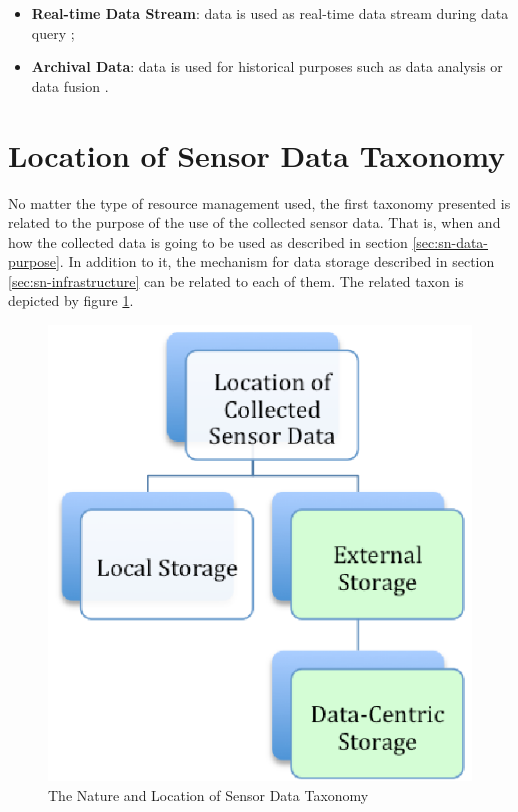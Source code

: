 \begin{itemize}
  \item \textbf{Real-time Data Stream}: data is used as real-time data stream
  during data query \cite{sn-intro01};
  \item \textbf{Archival Data}: data is used for historical purposes such as
  data analysis or data fusion \cite{sn-intro01, sn-intro02}.
\end{itemize}

\section{Location of Sensor Data Taxonomy}

No matter the type of resource management used, the first taxonomy presented is
related to the purpose of the use of the collected sensor data. That is, when
and how the collected data is going to be used as described in section
\ref{sec:sn-data-purpose}. In addition to it, the mechanism for data storage
described in section \ref{sec:sn-infrastructure} can be related to each of
them. The related taxon is depicted by figure \ref{fig:taxonomy-data-location}.

\begin{figure}[h]
  \centering
  \includegraphics{../diagrams/taxonomy-data-location}
  \caption{The Nature and Location of Sensor Data Taxonomy}
  \label{fig:taxonomy-data-location}
\end{figure}

